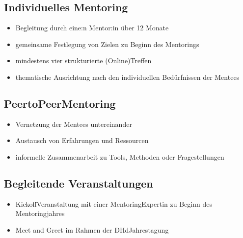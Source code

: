 \documentclass[letterpaper,10pt,english]{jupyterBook}
\begin{document}
\subsection{Individuelles Mentoring}
\label{\detokenize{mentoring/programm:individuelles-mentoring}}\begin{itemize}
\item {} 
\sphinxAtStartPar
Begleitung durch eine:n Mentor:in über 12 Monate

\item {} 
\sphinxAtStartPar
gemeinsame Festlegung von Zielen zu Beginn des Mentorings

\item {} 
\sphinxAtStartPar
mindestens vier strukturierte (Online\sphinxhyphen{})Treffen

\item {} 
\sphinxAtStartPar
thematische Ausrichtung nach den individuellen Bedürfnissen der Mentees

\end{itemize}


\subsection{Peer\sphinxhyphen{}to\sphinxhyphen{}Peer\sphinxhyphen{}Mentoring}
\label{\detokenize{mentoring/programm:peer-to-peer-mentoring}}\begin{itemize}
\item {} 
\sphinxAtStartPar
Vernetzung der Mentees untereinander

\item {} 
\sphinxAtStartPar
Austausch von Erfahrungen und Ressourcen

\item {} 
\sphinxAtStartPar
informelle Zusammenarbeit zu Tools, Methoden oder Fragestellungen

\end{itemize}


\subsection{Begleitende Veranstaltungen}
\label{\detokenize{mentoring/programm:begleitende-veranstaltungen}}\begin{itemize}
\item {} 
\sphinxAtStartPar
Kick\sphinxhyphen{}off\sphinxhyphen{}Veranstaltung mit einer Mentoring\sphinxhyphen{}Expertin zu Beginn des Mentoringjahres

\item {} 
\sphinxAtStartPar
Meet and Greet im Rahmen der DHd\sphinxhyphen{}Jahrestagung

\end{itemize}
\end{document}
